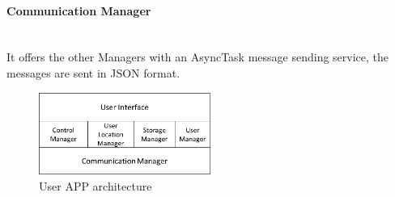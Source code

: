 \paragraph{Communication Manager}\mbox{}\\
It offers the other Managers with an AsyncTask message sending service, the messages are sent in JSON format.

\begin{figure}[h]
\centering
\includegraphics[width=0.5\textwidth]{Figures/software3}
\caption{User APP architecture }
\label{software3}
\end{figure}
